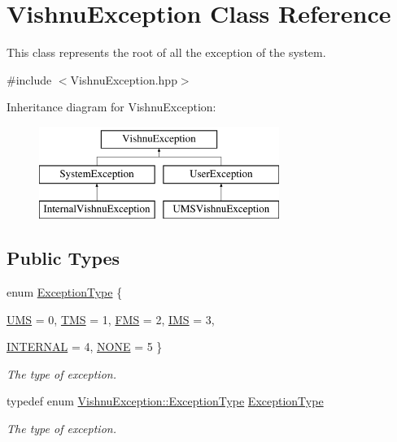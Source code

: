 \hypertarget{classVishnuException}{
\section{VishnuException Class Reference}
\label{classVishnuException}
}


This class represents the root of all the exception of the system.  




{\ttfamily \#include $<$VishnuException.hpp$>$}

Inheritance diagram for VishnuException:\begin{figure}[H]
\begin{center}
\leavevmode
\includegraphics[height=3.000000cm]{classVishnuException}
\end{center}
\end{figure}
\subsection*{Public Types}
\begin{DoxyCompactItemize}
\item 
enum \hyperlink{classVishnuException_ad9de1e07d1e54a454cd2f7f3883de001}{ExceptionType} \{ \par
\hyperlink{classVishnuException_ad9de1e07d1e54a454cd2f7f3883de001a75dfbd63efc45f759335784afc2a21df}{UMS} =  0, 
\hyperlink{classVishnuException_ad9de1e07d1e54a454cd2f7f3883de001a06dc1eee51aff5d00237e67ea4327035}{TMS} =  1, 
\hyperlink{classVishnuException_ad9de1e07d1e54a454cd2f7f3883de001a8bf79f006a7f499ff19a29f961e3b587}{FMS} =  2, 
\hyperlink{classVishnuException_ad9de1e07d1e54a454cd2f7f3883de001a1cad27b5570c824a1ed1dbe3cc2a23ed}{IMS} =  3, 
\par
\hyperlink{classVishnuException_ad9de1e07d1e54a454cd2f7f3883de001aa62f896d183527469a8281313eae4ea8}{INTERNAL} =  4, 
\hyperlink{classVishnuException_ad9de1e07d1e54a454cd2f7f3883de001aff77e716a0cf84478ddbd9b0f4737ce3}{NONE} =  5
 \}
\begin{DoxyCompactList}\small\item\em The type of exception. \item\end{DoxyCompactList}\item 
\hypertarget{classVishnuException_aba758c9545d4f417123ce27c512d8f31}{
typedef enum \hyperlink{classVishnuException_ad9de1e07d1e54a454cd2f7f3883de001}{VishnuException::ExceptionType} \hyperlink{classVishnuException_aba758c9545d4f417123ce27c512d8f31}{ExceptionType}}
\label{classVishnuException_aba758c9545d4f417123ce27c512d8f31}

\begin{DoxyCompactList}\small\item\em The type of exception. \item\end{DoxyCompactList}\end{DoxyCompactItemize}
